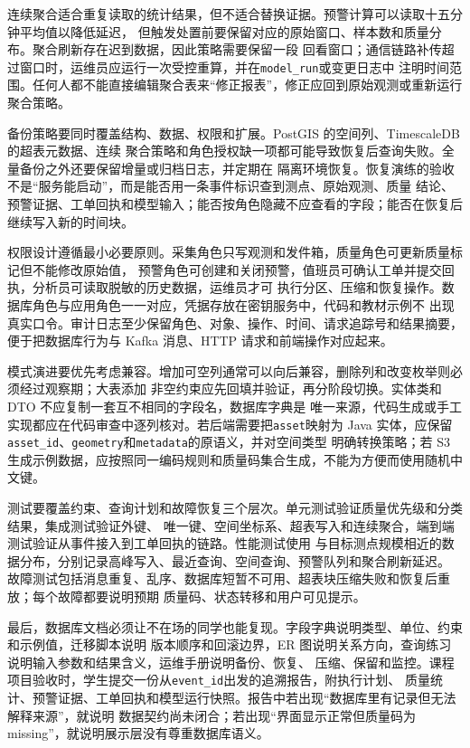 连续聚合适合重复读取的统计结果，但不适合替换证据。预警计算可以读取十五分钟平均值以降低延迟，
但触发处置前要保留对应的原始窗口、样本数和质量分布。聚合刷新存在迟到数据，因此策略需要保留一段
回看窗口；通信链路补传超过窗口时，运维员应运行一次受控重算，并在\texttt{model\_run}或变更日志中
注明时间范围。任何人都不能直接编辑聚合表来“修正报表”，修正应回到原始观测或重新运行聚合策略。

备份策略要同时覆盖结构、数据、权限和扩展。PostGIS 的空间列、TimescaleDB 的超表元数据、连续
聚合策略和角色授权缺一项都可能导致恢复后查询失败。全量备份之外还要保留增量或归档日志，并定期在
隔离环境恢复。恢复演练的验收不是“服务能启动”，而是能否用一条事件标识查到测点、原始观测、质量
结论、预警证据、工单回执和模型输入；能否按角色隐藏不应查看的字段；能否在恢复后继续写入新的时间块。

权限设计遵循最小必要原则。采集角色只写观测和发件箱，质量角色可更新质量标记但不能修改原始值，
预警角色可创建和关闭预警，值班员可确认工单并提交回执，分析员可读取脱敏的历史数据，运维员才可
执行分区、压缩和恢复操作。数据库角色与应用角色一一对应，凭据存放在密钥服务中，代码和教材示例不
出现真实口令。审计日志至少保留角色、对象、操作、时间、请求追踪号和结果摘要，便于把数据库行为与
Kafka 消息、HTTP 请求和前端操作对应起来。

模式演进要优先考虑兼容。增加可空列通常可以向后兼容，删除列和改变枚举则必须经过观察期；大表添加
非空约束应先回填并验证，再分阶段切换。实体类和 DTO 不应复制一套互不相同的字段名，数据库字典是
唯一来源，代码生成或手工实现都应在代码审查中逐列核对。若后端需要把\texttt{asset}映射为 Java
实体，应保留\texttt{asset\_id}、\texttt{geometry}和\texttt{metadata}的原语义，并对空间类型
明确转换策略；若 S3 生成示例数据，应按照同一编码规则和质量码集合生成，不能为方便而使用随机中文键。

测试要覆盖约束、查询计划和故障恢复三个层次。单元测试验证质量优先级和分类结果，集成测试验证外键、
唯一键、空间坐标系、超表写入和连续聚合，端到端测试验证从事件接入到工单回执的链路。性能测试使用
与目标测点规模相近的数据分布，分别记录高峰写入、最近查询、空间查询、预警队列和聚合刷新延迟。
故障测试包括消息重复、乱序、数据库短暂不可用、超表块压缩失败和恢复后重放；每个故障都要说明预期
质量码、状态转移和用户可见提示。

最后，数据库文档必须让不在场的同学也能复现。字段字典说明类型、单位、约束和示例值，迁移脚本说明
版本顺序和回滚边界，ER 图说明关系方向，查询练习说明输入参数和结果含义，运维手册说明备份、恢复、
压缩、保留和监控。课程项目验收时，学生提交一份从\texttt{event\_id}出发的追溯报告，附执行计划、
质量统计、预警证据、工单回执和模型运行快照。报告中若出现“数据库里有记录但无法解释来源”，就说明
数据契约尚未闭合；若出现“界面显示正常但质量码为 missing”，就说明展示层没有尊重数据库语义。

